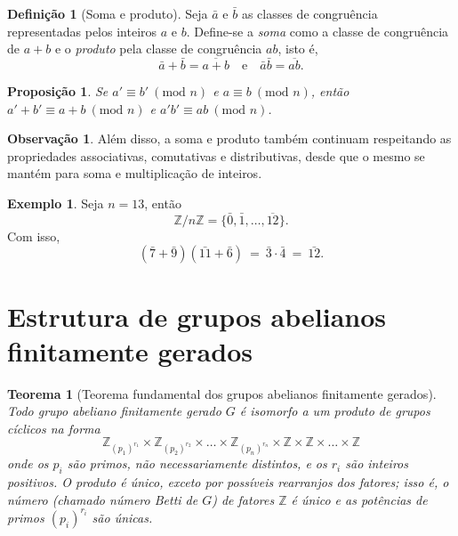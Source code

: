 \documentclass[a4paper,12pt]{report}
\theoremstyle{plain}
\newtheorem{teorema}{Teorema}[section]
\newtheorem{proposicao}{Proposição}[section]
\theoremstyle{definition}
\newtheorem{definicao}{Definição}[section]
\newtheorem{observacao}{Observação}[section]
\newtheorem{exemplo}{Exemplo}[section]
\begin{document}
\begin{definicao}[Soma e produto]
	Seja \(\bar a\) e \(\bar b\) as classes de congruência representadas pelos inteiros \(a\) e \(b\). Define-se a \emph{soma} como a classe de congruência de \(a+b\) e o \emph{produto} pela classe de congruência \(ab\), isto é, \[\bar a + \bar b = \overline{a+b} \quad \text{e}\quad \bar a\bar b = \overline{ab}.\]	
\end{definicao}

\begin{proposicao}
	Se \(a' \equiv b'\ (\text{mod }n)\) e \(a\equiv b\ (\text{mod }n)\), então
	\(a' + b' \equiv a+b\ (\text{mod }n)\) e
	\(a'b' \equiv ab \ (\text{mod }n)\).
\end{proposicao}

\begin{observacao}
	Além disso, a soma e produto também continuam respeitando as
	propriedades associativas, comutativas e distributivas, desde que o
	mesmo se mantém para soma e multiplicação de inteiros.
\end{observacao}

\begin{exemplo}
	Seja \(n = 13\), então
	\[\mathbb{Z}/n\mathbb{Z} =  \{\bar{0}, \bar{1},\dots,\overline{12}\}.\]
	Com isso,
	\[(\bar 7 + \bar 9)(\bar{11} + \bar 6) \ = \ \bar 3 \cdot \bar 4 \ = \ \bar{12}.\]
\end{exemplo}


\section{Estrutura de grupos abelianos finitamente gerados}

\begin{teorema}[Teorema fundamental dos grupos abelianos finitamente gerados] \label{teo:abelianfinitelygenerately}
	Todo grupo abeliano finitamente gerado $G$ é isomorfo a um produto de grupos cíclicos na forma $$\mathbb{Z}_{(p_1)^{r_1}}\times\mathbb{Z}_{(p_2)^{r_2}}\times\dots\times\mathbb{Z}_{(p_n)^{r_n}}\times\mathbb{Z}\times\mathbb{Z}\times\dots\times\mathbb{Z} $$ onde os $p_i$ são primos, não necessariamente distintos, e os $r_i$ são inteiros positivos. O produto é único, exceto por possíveis rearranjos dos fatores; isso é, o número (chamado \emph{número Betti de $G$}) de fatores $\mathbb{Z}$ é único e as potências de primos $(p_i)^{r_i}$ são únicas.
\end{teorema}
\end{document}
